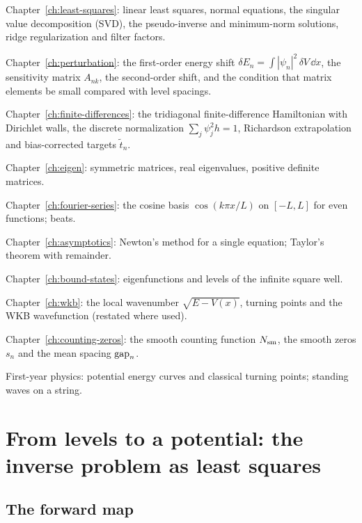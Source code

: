 \begin{prerequisites}
\item Chapter~\ref{ch:least-squares}: linear least squares, normal equations, the singular value decomposition (SVD), the pseudo-inverse and minimum-norm solutions, ridge regularization and filter factors.
\item Chapter~\ref{ch:perturbation}: the first-order energy shift $\delta E_n=\int|\psi_n|^2\,\delta V\,\dd x$, the sensitivity matrix $A_{nk}$, the second-order shift, and the condition that matrix elements be small compared with level spacings.
\item Chapter~\ref{ch:finite-differences}: the tridiagonal finite-difference Hamiltonian with Dirichlet walls, the discrete normalization $\sum_j\psi_j^2h=1$, Richardson extrapolation and bias-corrected targets $\tilde t_n$.
\item Chapter~\ref{ch:eigen}: symmetric matrices, real eigenvalues, positive definite matrices.
\item Chapter~\ref{ch:fourier-series}: the cosine basis $\cos(k\pi x/L)$ on $[-L,L]$ for even functions; beats.
\item Chapter~\ref{ch:asymptotics}: Newton's method for a single equation; Taylor's theorem with remainder.
\item Chapter~\ref{ch:bound-states}: eigenfunctions and levels of the infinite square well.
\item Chapter~\ref{ch:wkb}: the local wavenumber $\sqrt{E-V(x)}$, turning points and the WKB wavefunction (restated where used).
\item Chapter~\ref{ch:counting-zeros}: the smooth counting function $N_{\mathrm{sm}}$, the smooth zeros $s_n$ and the mean spacing $\mathrm{gap}_n$.
\item First-year physics: potential energy curves and classical turning points; standing waves on a string.
\end{prerequisites}

\section{From levels to a potential: the inverse problem as least squares}\label{sec:fitting-problem}

\subsection{The forward map}

